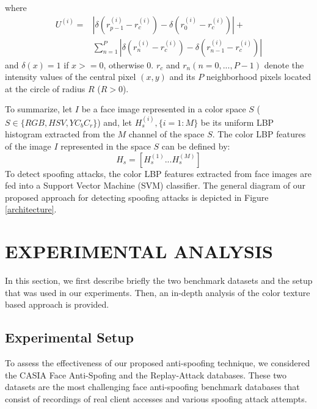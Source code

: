 \documentclass{article}
\begin{document}
where
\begin{equation}
\begin{split}
U^{(i)}=&\left|\delta(r_{p-1}^{(i)}-r_{c}^{(i)})-\delta(r_{0}^{(i)}-r_{c}^{(i)})\right|+\\
&\sum_{n=1}^{P}\left|\delta(r_{n}^{(i)}-r_{c}^{(i)})-\delta(r_{n-1}^{(i)}-r_{c}^{(i)})\right|
\end{split}
\end{equation}
and $\delta(x)= 1$ if $x>=0$, otherwise $0$. $r_c$ and $r_n(n=0,...,P-1)$ denote the intensity values of the central pixel $(x,y)$ and its $P$ neighborhood pixels located at the circle of radius $R$ ($R>0$).  

To summarize, let $I$ be a face image represented in a color space $S$ ($S \in\{RGB, HSV, YC_bC_r\}$) and, let $H_s^{(i)}, \{i=1:M\}$ be its uniform LBP histogram extracted from the $M$ channel of the space $S$. The color LBP features of the image $I$ represented in the space $S$ can be defined by:
\begin{equation}
\label{color_LBP} 
H_s=[H_s^{(1)}...H_s^{(M)}]
\end{equation} 
To detect spoofing  attacks, the color LBP features extracted from  face images are fed into a Support Vector Machine (SVM) classifier. The general  diagram of our proposed approach for detecting spoofing attacks is depicted in Figure \ref{architecture}.
\vspace{-6mm}
\section{EXPERIMENTAL ANALYSIS}
	\vspace{-2mm}
\label{sec:experiments} 
In this section, we first describe briefly the two benchmark datasets and the setup that was used in our experiments. Then, an in-depth analysis of the color texture based approach is provided.
\vspace{-2mm}
\subsection{ Experimental Setup}
To assess the effectiveness of our proposed anti-spoofing technique, we considered the CASIA Face Anti-Spofing and the Replay-Attack databases. These two datasets are the most challenging  face anti-spoofing benchmark databases that consist of recordings of real client accesses and various spoofing attack attempts.
\end{document}
